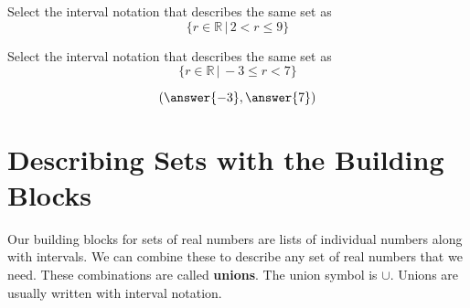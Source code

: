 \documentclass{ximera}
\begin{document}
\begin{problem}
Select the interval notation that describes the same set as 
\[ \{ r \in \mathbb {R} \, | \, 2 < r \leq 9 \} \]
	\begin{multipleChoice}
	\choice {$[9, 2)$}
	\choice {$[2, 9)$}
	\choice [correct]{$(2, 9]$}
	\choice {$[2, 9]$}
	\end{multipleChoice}
\end{problem}





\begin{problem}
Select the interval notation that describes the same set as 
\[ \{ r \in \mathbb {R} \, | \, -3 \leq r < 7 \} \]

\[
\left ( \answer{-3} , \answer{7} \right )
\]



\end{problem}


\section{Describing Sets with the Building Blocks}

Our building blocks for sets of real numbers are lists of individual numbers along with intervals.  We can combine these to describe any set of real numbers that we need.  These combinations are called \textbf{unions}.  The union symbol is $\cup$. Unions are usually written with interval notation.
\end{document}
